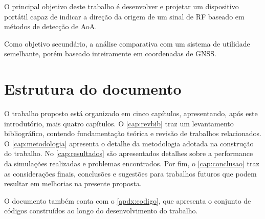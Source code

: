 O principal objetivo deste trabalho é desenvolver e projetar um dispositivo portátil capaz de indicar a direção da origem de um sinal de \ac{RF} baseado em métodos de detecção de \ac{AoA}.

Como objetivo secundário, a análise comparativa com um sistema de utilidade semelhante, porém baseado inteiramente em coordenadas de \ac{GNSS}.

\section{Estrutura do documento}


O trabalho proposto está organizado em cinco capítulos, apresentando, após este introdutório, mais quatro capítulos.
O \autoref{cap:revbib} traz um levantamento bibliográfico, contendo fundamentação teórica e revisão de trabalhos relacionados.
O \autoref{cap:metodologia} apresenta o detalhe da metodologia adotada na construção do trabalho.
No \autoref{cap:resultados} são apresentados detalhes sobre a performance da simulações realizadas e problemas encontrados.
Por fim, o \autoref{cap:conclusao} traz as considerações finais, conclusões e sugestões para trabalhos futuros que podem resultar em melhorias na presente proposta.

O documento também conta com o \autoref{apdx:codigo}, que apresenta o conjunto de códigos construídos ao longo do desenvolvimento do trabalho.

